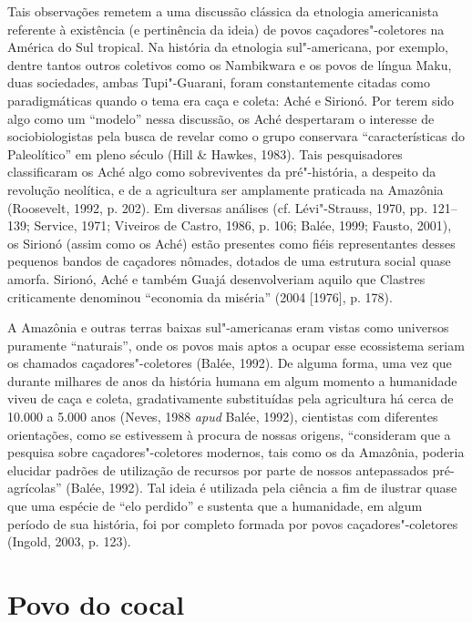 Tais observações remetem a uma discussão clássica da etnologia
americanista referente à existência (e pertinência da ideia) de povos
caçadores"-coletores na América do Sul tropical. Na história da etnologia
sul"-americana, por exemplo, dentre tantos outros coletivos como os
Nambikwara e os povos de língua Maku, duas sociedades, ambas
Tupi"-Guarani, foram constantemente citadas como paradigmáticas quando o
tema era caça e coleta: Aché e Sirionó. Por terem sido algo como um
``modelo'' nessa discussão, os Aché despertaram o interesse de
sociobiologistas pela busca de revelar como o grupo conservara
``características do Paleolítico'' em pleno século  (Hill \& Hawkes,
1983). Tais pesquisadores classificaram os Aché algo como sobreviventes
da pré"-história, a despeito da revolução neolítica, e de a agricultura
ser amplamente praticada na Amazônia (Roosevelt, 1992, p. 202). Em diversas
análises (cf. Lévi"-Strauss, 1970, pp. 121--139; Service, 1971; Viveiros de
Castro, 1986, p. 106; Balée, 1999; Fausto, 2001), os Sirionó (assim como os
Aché) estão presentes como fiéis representantes desses pequenos bandos
de caçadores nômades, dotados de uma estrutura social quase amorfa.
Sirionó, Aché e também Guajá desenvolveriam aquilo que Clastres
criticamente denominou ``economia da miséria'' (2004 {[}1976{]}, p. 178).

A Amazônia e outras terras baixas sul"-americanas eram vistas como
universos puramente ``naturais'', onde os povos mais aptos a ocupar esse
ecossistema seriam os chamados caçadores"-coletores (Balée, 1992). De
alguma forma, uma vez que durante milhares de anos da história humana em
algum momento a humanidade viveu de caça e coleta, gradativamente
substituídas pela agricultura há cerca de 10.000 a 5.000 anos (Neves,
1988 \emph{apud} Balée, 1992), cientistas com diferentes orientações, como se
estivessem à procura de nossas origens, ``consideram que a pesquisa
sobre caçadores"-coletores modernos, tais como os da Amazônia, poderia
elucidar padrões de utilização de recursos por parte de nossos
antepassados pré-agrícolas'' (Balée, 1992). Tal ideia é utilizada pela
ciência a fim de ilustrar quase que uma espécie de ``elo perdido'' e
sustenta que a humanidade, em algum período de sua história, foi por
completo formada por povos caçadores"-coletores (Ingold, 2003, p. 123).

\section{Povo do cocal}

